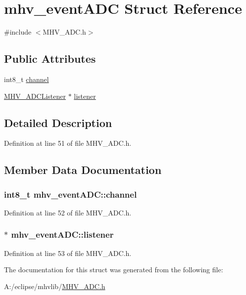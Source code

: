 \hypertarget{structmhv__event_a_d_c}{\section{mhv\-\_\-event\-A\-D\-C Struct Reference}
\label{structmhv__event_a_d_c}
}


{\ttfamily \#include $<$M\-H\-V\-\_\-\-A\-D\-C.\-h$>$}

\subsection*{Public Attributes}
\begin{DoxyCompactItemize}
\item 
int8\-\_\-t \hyperlink{structmhv__event_a_d_c_a3c4932e6a013a8ad48327d1e89eaa623}{channel}
\item 
\hyperlink{class_m_h_v___a_d_c_listener}{M\-H\-V\-\_\-\-A\-D\-C\-Listener} $\ast$ \hyperlink{structmhv__event_a_d_c_a3688f1e9b5f4662afc7e892967229e46}{listener}
\end{DoxyCompactItemize}


\subsection{Detailed Description}


Definition at line 51 of file M\-H\-V\-\_\-\-A\-D\-C.\-h.



\subsection{Member Data Documentation}
\hypertarget{structmhv__event_a_d_c_a3c4932e6a013a8ad48327d1e89eaa623}{
\subsubsection[{channel}]{\setlength{\rightskip}{0pt plus 5cm}int8\-\_\-t mhv\-\_\-event\-A\-D\-C\-::channel}}\label{structmhv__event_a_d_c_a3c4932e6a013a8ad48327d1e89eaa623}


Definition at line 52 of file M\-H\-V\-\_\-\-A\-D\-C.\-h.

\hypertarget{structmhv__event_a_d_c_a3688f1e9b5f4662afc7e892967229e46}{
\subsubsection[{listener}]{$\ast$ mhv\-\_\-event\-A\-D\-C\-::listener}}\label{structmhv__event_a_d_c_a3688f1e9b5f4662afc7e892967229e46}


Definition at line 53 of file M\-H\-V\-\_\-\-A\-D\-C.\-h.



The documentation for this struct was generated from the following file\-:\begin{DoxyCompactItemize}
\item 
A\-:/eclipse/mhvlib/\hyperlink{_m_h_v___a_d_c_8h}{M\-H\-V\-\_\-\-A\-D\-C.\-h}\end{DoxyCompactItemize}
